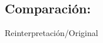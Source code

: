 \documentclass[11pt,a4paper]{article}
\begin{document}
		\subsection{Comparación:}
		\begin{center}
		
		\centerline{}
		Reinterpretación/Original
		\end{center}
\end{document}
